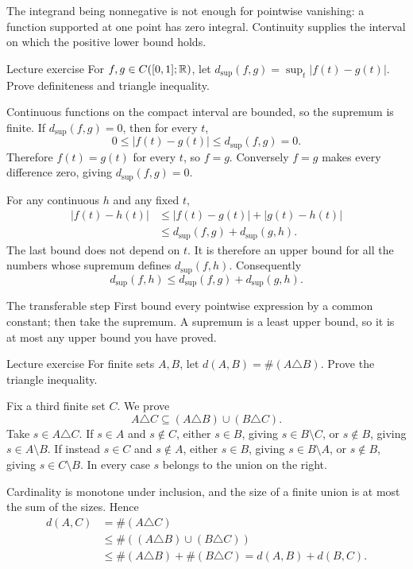 \begin{tip}
The integrand being nonnegative is not enough for pointwise vanishing: a function supported at one point has zero integral. Continuity supplies the interval on which the positive lower bound holds.
\end{tip}
\begin{exam}{Lecture exercise}
For $f,g\in C([0,1];\mathbb R)$, let $d_{\sup}(f,g)=\sup_t|f(t)-g(t)|$. Prove definiteness and triangle inequality.
\end{exam}
\begin{answer}
Continuous functions on the compact interval are bounded, so the supremum is finite. If $d_{\sup}(f,g)=0$, then for every $t$,
\[0\le |f(t)-g(t)|\le d_{\sup}(f,g)=0.\]
Therefore $f(t)=g(t)$ for every $t$, so $f=g$. Conversely $f=g$ makes every difference zero, giving $d_{\sup}(f,g)=0$.

For any continuous $h$ and any fixed $t$,
\begin{align*}
|f(t)-h(t)|&\le |f(t)-g(t)|+|g(t)-h(t)|\\
&\le d_{\sup}(f,g)+d_{\sup}(g,h).
\end{align*}
The last bound does not depend on $t$. It is therefore an upper bound for all the numbers whose supremum defines $d_{\sup}(f,h)$. Consequently
\[d_{\sup}(f,h)\le d_{\sup}(f,g)+d_{\sup}(g,h).\]
\end{answer}
\begin{method}{The transferable step}
First bound every pointwise expression by a common constant; then take the supremum. A supremum is a least upper bound, so it is at most any upper bound you have proved.
\end{method}
\begin{exam}{Lecture exercise}
For finite sets $A,B$, let $d(A,B)=\#(A\triangle B)$. Prove the triangle inequality.
\end{exam}
\begin{answer}
Fix a third finite set $C$. We prove
\[A\triangle C\subseteq(A\triangle B)\cup(B\triangle C).\]
Take $s\in A\triangle C$. If $s\in A$ and $s\notin C$, either $s\in B$, giving $s\in B\setminus C$, or $s\notin B$, giving $s\in A\setminus B$. If instead $s\in C$ and $s\notin A$, either $s\in B$, giving $s\in B\setminus A$, or $s\notin B$, giving $s\in C\setminus B$. In every case $s$ belongs to the union on the right.

Cardinality is monotone under inclusion, and the size of a finite union is at most the sum of the sizes. Hence
\begin{align*}
d(A,C)&=\#(A\triangle C)\\
&\le\#((A\triangle B)\cup(B\triangle C))\\
&\le\#(A\triangle B)+\#(B\triangle C)=d(A,B)+d(B,C).
\end{align*}
\end{answer}
